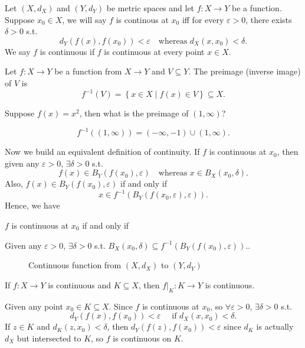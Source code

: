 \begin{definition} \label{def: continuous}
    Let \((X, d_X)\) and \((Y, d_Y)\) be metric spaces and let \(f: X \to Y\) be a function. Suppose \(x_0 \in X\), we will say \(f\) is continous at \(x_0\) iff for every \(\varepsilon > 0\), there exists \(\delta > 0\) s.t. 
    \[
        d_Y(f(x), f(x_0)) < \varepsilon \quad \text{whereas } d_X(x, x_0) < \delta.
    \] We say \(f\) is continuous if \(f\) is continuous at every point \(x \in X\).     
\end{definition}

\begin{definition}[Preimage] \label{def: preimage}
    Let \(f : X \to Y\) be a function from \(X \to Y\) and \(V \subseteq Y\). The preimage (inverse image) of \(V\) is 
    \[
        f^{-1}(V) = \left\{ x\in X \mid f(x) \in V \right\} \subseteq X.
    \]    
\end{definition}

\begin{eg}
    Suppose \(f(x) = x^2\), then what is the preimage of \((1, \infty )\)?  
\end{eg}
\begin{answer}
    \[
        f^{-1}((1, \infty )) = (-\infty , -1) \cup (1, \infty ).
    \]
\end{answer}
Now we build an equivalent definition of continuity. If \(f\) is continuous at \(x_0\), then given any \(\varepsilon > 0\), \(\exists \delta > 0\) s.t. 
\[
    f(x) \in B_Y(f(x_0), \varepsilon ) \quad \text{whereas } x \in B_X(x_0, \delta ).
\]  Also, \(f(x) \in B_Y(f(x_0), \varepsilon )\) if and only if
\[
    x \in f^{-1}(B_Y(f(x_0, \varepsilon ), \varepsilon )).
\] Hence, we have 
\begin{corollary}
    \(f\) is continuous at \(x_0\) if and only if 
    \begin{center}
        Given any \(\varepsilon > 0\), \(\exists \delta > 0\) s.t. \(B_X(x_0, \delta ) \subseteq f^{-1}(B_Y(f(x_0), \varepsilon )).\).   
    \end{center}  
\end{corollary}
\begin{figure}[H]
    \centering
    \caption{Continuous function from \((X, d_X)\) to \((Y, d_Y)\)}
    \label{fig:conti}
\end{figure}
\begin{remark} \label{rmk: if f conti then f intersect K conti}
    If \(f: X \to Y\) is continuous and \(K \subseteq X\), then \(f\vert_K : K \to Y\) is continuous.   
\end{remark}
\begin{explanation}
    Given any point \(x_0 \in K \subseteq X\). Since \(f\) is continuous at \(x_0\), so \(\forall \varepsilon > 0\), \(\exists \delta > 0\) s.t. 
    \[
        d_Y\left( f(x), f(x_0) \right) < \varepsilon \quad \text{ if } d_X(x, x_0) < \delta. 
    \]     
    If \(z \in K\) and \(d_K(z, x_0) < \delta \), then \(d_Y(f(z), f(x_0)) <\varepsilon \) since \(d_K\) is actually \(d_X\) but intersected to \(K\), so \(f\) is continuous on \(K\).     
\end{explanation}

